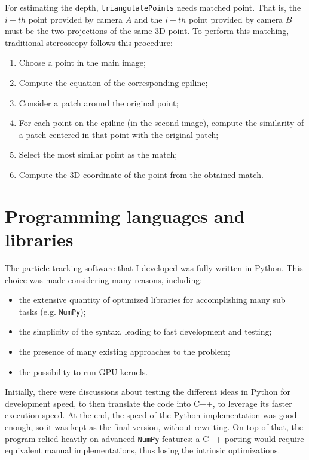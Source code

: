 For estimating the depth, \texttt{triangulatePoints} needs matched point.
That is, the $i{-}th$ point provided by camera $A$ and the $i{-}th$ point provided by camera $B$ must be the two projections of the same 3D point.
To perform this matching, traditional stereoscopy follows this procedure:
\begin{enumerate}
	\itemsep 0em
	\item Choose a point in the main image;
	\item Compute the equation of the corresponding epiline;
	\item Consider a patch around the original point;
	\item For each point on the epiline (in the second image), compute the similarity of a patch centered in that point with the original patch;
	\item Select the most similar point as the match;
	\item Compute the 3D coordinate of the point from the obtained match.
\end{enumerate}

\section{Programming languages and libraries}

The particle tracking software that I developed was fully written in Python.
This choice was made considering many reasons, including:
\begin{itemize}
	\itemsep 0em
	\item the extensive quantity of optimized libraries for accomplishing many sub tasks (e.g. \texttt{NumPy});
	\item the simplicity of the syntax, leading to fast development and testing;
	\item the presence of many existing approaches to the problem;
	\item the possibility to run GPU kernels.
\end{itemize}
Initially, there were discussions about testing the different ideas in Python for development speed, to then translate the code into C++, to leverage its faster execution speed.
At the end, the speed of the Python implementation was good enough, so it was kept as the final version, without rewriting.
On top of that, the program relied heavily on advanced \texttt{NumPy} features: a C++ porting would require equivalent manual implementations, thus losing the intrinsic optimizations.

